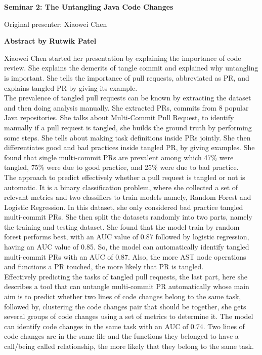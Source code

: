 \documentclass[12pt,letterpaper]{report}
\begin{document}
\newpage
\begin{center}
    \textbf{Seminar 2: The Untangling Java Code Changes}
        
    \vspace{1em}
    Original presenter: Xiaowei Chen
   
    \vspace{2em}
    \textbf{Abstract by Rutwik Patel}
\end{center}

Xiaowei Chen started her presentation by explaining the importance of code review. She explains the demerits of tangle commit and explained why untangling is important. She tells the importance of pull requests, abbreviated as PR, and explains tangled PR by giving its example.\\

The prevalence of tangled pull requests can be known by extracting the dataset and then doing analysis manually. She extracted PRs, commits from 8 popular Java repositories. She talks about Multi-Commit Pull Request, to identify manually if a pull request is tangled, she builds the ground truth by performing some steps. She tells about making task definitions inside PRs jointly. She then differentiates good and bad practices inside tangled PR, by giving examples. She found that single multi-commit PRs are prevalent among which 47\% were tangled, 75\% were due to good practice, and 25\% were due to bad practice.  \\

The approach to predict effectively whether a pull request is tangled or not is automatic. It is a binary classification problem, where she collected a set of relevant metrics and two classifiers to train models namely, Random Forest and Logistic Regression. In this dataset, she only considered bad practice tangled multi-commit PRs. She then split the datasets randomly into two parts, namely the training and testing dataset. She found that the model train by random forest performs best, with an AUC value of 0.87 followed by logistic regression, having an AUC value of 0.85. So, the model can automatically identify tangled multi-commit PRs with an AUC of 0.87. Also, the more AST node operations and functions a PR touched, the more likely that PR is tangled. \\

Effectively predicting the tasks of tangled pull requests, the last part, here she describes a tool that can untangle multi-commit PR automatically whose main aim is to predict whether two lines of code changes belong to the same task, followed by, clustering the code changes pair that should be together, she gets several groups of code changes using a set of metrics to determine it. The model can identify code changes in the same task with an AUC of 0.74. Two lines of code changes are in the same file and the functions they belonged to have a call/being called relationship, the more likely that they belong to the same task. \\
\end{document}
